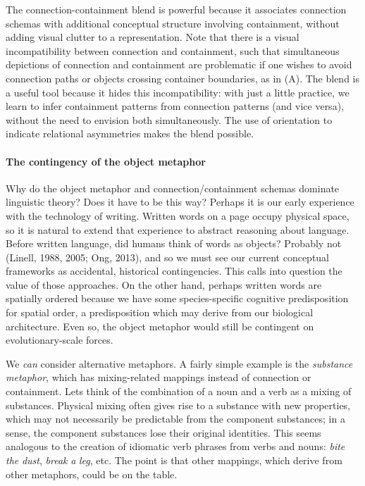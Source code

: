   The connection-containment blend is powerful because it associates connection schemas with additional conceptual structure involving containment, without adding visual clutter to a representation. Note that there is a visual incompatibility between connection and containment, such that simultaneous depictions of connection and containment are problematic if one wishes to avoid connection paths or objects crossing container boundaries, as in (A). The blend is a useful tool because it hides this incompatibility: with just a little practice, we learn to infer containment patterns from connection patterns (and vice versa), without the need to envision both simultaneously. The use of orientation to indicate relational asymmetries makes the blend possible.

\paragraph{{\textbf{The contingency of the object metaphor}}}

Why do the object metaphor and connection/containment schemas dominate linguistic theory? Does it have to be this way? Perhaps it is our early experience with the technology of writing. Written words on a page occupy physical space, so it is natural to extend that experience to abstract reasoning about language. Before written language, did humans think of words as objects? Probably not (Linell, 1988, 2005; Ong, 2013), and so we must see our current conceptual frameworks as accidental, historical contingencies. This calls into question the value of those approaches. On the other hand, perhaps written words are spatially ordered because we have some species-specific cognitive predisposition for spatial order, a predisposition which may derive from our biological architecture. Even so, the object metaphor would still be contingent on evolutionary-scale forces. 

  We \textit{can} consider alternative metaphors. A fairly simple example is the \textit{substance} \textit{metaphor}, which has mixing-related mappings instead of connection or containment. Lets think of the combination of a noun and a verb as a mixing of substances. Physical mixing often gives rise to a substance with new properties, which may not necessarily be predictable from the component substances; in a sense, the component substances lose their original identities. This seems analogous to the creation of idiomatic verb phrases from verbs and nouns: \textit{bite} \textit{the} \textit{dust}, \textit{break} \textit{a} \textit{leg}, etc. The point is that other mappings, which derive from other metaphors, could be on the table.

